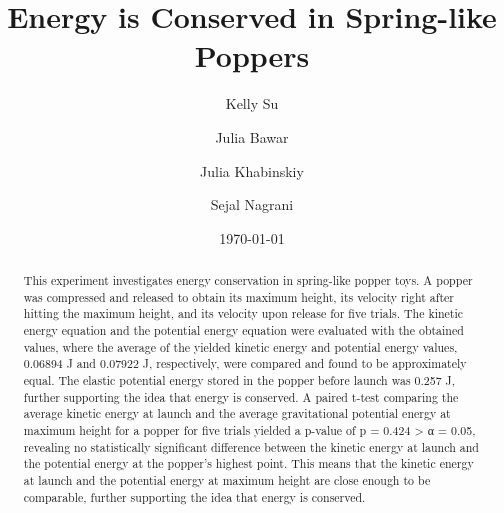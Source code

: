 \documentclass[amsmath,amssymb,aps,endfloats,linenumbers]{revtex4-2}
\begin{document}

\title{Energy is Conserved in Spring-like Poppers}
\author{Kelly Su}
\author{Julia Bawar}
\author{Julia Khabinskiy}
\author{Sejal Nagrani}
\date{\today}


\begin{abstract}
This experiment investigates energy conservation in spring-like popper toys. A popper was compressed and released to obtain its maximum height, its velocity right after hitting the maximum height, and its velocity upon release for five trials. The kinetic energy equation and the potential energy equation were evaluated with the obtained values, where the average of the yielded kinetic energy and potential energy values, 0.06894 J and 0.07922 J, respectively, were compared and found to be approximately equal. The elastic potential energy stored in the popper before launch was 0.257 J, further supporting the idea that energy is conserved. A paired t-test comparing the average kinetic energy at launch and the average gravitational potential energy at maximum height for a popper for five trials yielded a p-value of p = 0.424 > α = 0.05, revealing no statistically significant difference between the kinetic energy at launch and the potential energy at the popper’s highest point. This means that the kinetic energy at launch and the potential energy at maximum height are close enough to be comparable, further supporting the idea that energy is conserved. 
\end{abstract}


\maketitle\thispagestyle{mytitlepage}

\end{document}
